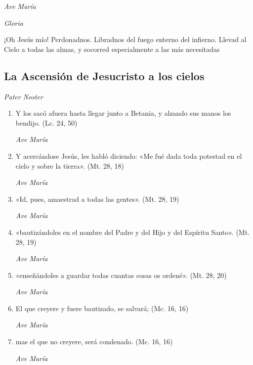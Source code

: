 \documentclass[a4paper,11pt, oneside]{report}
\begin{document}
        \textit{Ave María} \par
        \indent\textit{Gloria} \par
        \indent¡Oh Jesús mío! Perdonadnos. Libradnos del fuego enterno del infierno. Llevad al Cielo a todas las almas, y socorred especialmente a las más 
        necesitadas

      \subsection*{La Ascensión de Jesucristo a los cielos}
        
        \textit{Pater Noster}

        \begin{enumerate} 

          \item Y los sacó afuera hasta llegar junto a Betania, y alzando sus manos los bendijo. (Lc. 24, 50)

          \textit{Ave María}

          \item Y acercándose Jesús, les habló diciendo: «Me fué dada toda potestad en el cielo y sobre la tierra». (Mt. 28, 18)

          \textit{Ave María}

          \item «Id, pues, amaestrad a todas las gentes». (Mt. 28, 19)

          \textit{Ave María}

          \item «bautizándoles en el nombre del Padre y del Hijo y del Espíritu Santo». (Mt. 28, 19)

          \textit{Ave María}

          \item «enseñándoles a guardar todas cuantas cosas os ordené». (Mt. 28, 20)

          \textit{Ave María}

          \item El que creyere y fuere bautizado, se salvará; (Mc. 16, 16)

          \textit{Ave María}

          \item mas el que no creyere, será condenado. (Mc. 16, 16)

          \textit{Ave María}


\end{enumerate}
\end{document}
